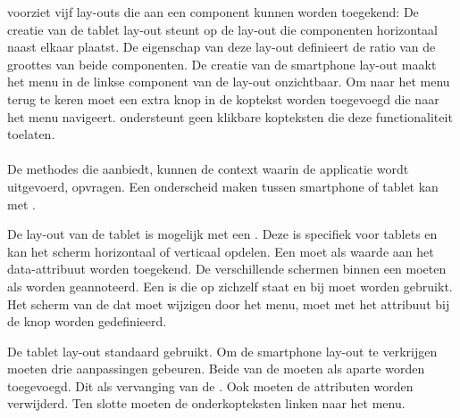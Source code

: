 \st{} voorziet vijf lay-outs die aan een component kunnen worden toegekend:
De creatie van de tablet lay-out steunt op de  lay-out die componenten horizontaal naast elkaar plaatst.
De  eigenschap van deze lay-out definieert de ratio van de groottes van beide componenten.
De creatie van de smartphone lay-out maakt het menu in de linkse component van de lay-out onzichtbaar.
Om naar het menu terug te keren moet een extra knop in de koptekst worden toegevoegd die naar het menu navigeert.
\st{} ondersteunt geen klikbare kopteksten die deze functionaliteit toelaten.

\paragraph{\kendo}
De methodes die  aanbiedt, kunnen de context waarin de applicatie wordt uitgevoerd, opvragen.
Een onderscheid maken tussen smartphone of tablet kan met .

De lay-out van de tablet is mogelijk met een .
Deze  is specifiek voor tablets en kan het scherm horizontaal of verticaal opdelen.
Een  moet als waarde aan het data-attribuut  worden toegekend.
De verschillende schermen binnen een  moeten als  worden geannoteerd.
Een  is  die op zichzelf staat en bij  moet worden gebruikt.
Het scherm van de  dat moet wijzigen door het menu, moet met het  attribuut bij de knop worden gedefinieerd.

De tablet lay-out standaard gebruikt.
Om de smartphone lay-out te verkrijgen moeten drie aanpassingen gebeuren.
Beide  van de  moeten als aparte  worden toegevoegd.
Dit als vervanging van de .
Ook moeten de  attributen worden verwijderd.
Ten slotte moeten de onderkopteksten linken naar het menu.

